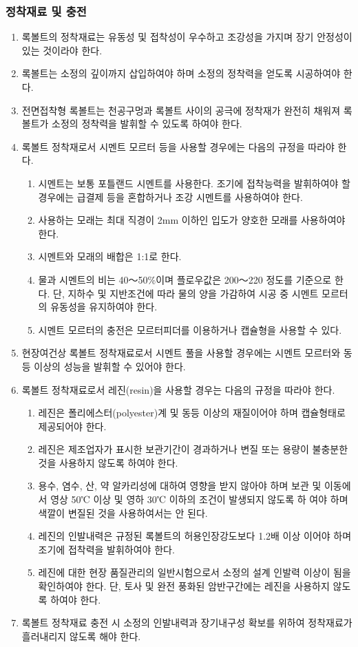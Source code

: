 \subsubsection{정착재료 및 충전}
\begin{enumerate}
\item  록볼트의 정착재료는 유동성 및 접착성이 우수하고 조강성을 가지며 장기 안정성이 있는 것이라야 한다.  
\item  록볼트는 소정의 깊이까지 삽입하여야 하며 소정의 정착력을 얻도록 시공하여야 한다.  
\item  전면접착형 록볼트는 천공구멍과 록볼트 사이의 공극에 정착재가 완전히 채워져 록볼트가 소정의 정착력을 발휘할 수 있도록 하여야 한다.  
\item  록볼트 정착재로서 시멘트 모르터 등을 사용할 경우에는 다음의 규정을 따라야 한다.  
	\begin{enumerate}
	\item  시멘트는 보통 포틀랜드 시멘트를 사용한다. 조기에 접착능력을 발휘하여야 할 경우에는 급결제 등을 혼합하거나 
	       조강 시멘트를 사용하여야 한다. 
	\item  사용하는 모래는 최대 직경이 2mm 이하인 입도가 양호한 모래를 사용하여야 한다. 
	\item  시멘트와 모래의 배합은 1:1로 한다. 
	\item  물과 시멘트의 비는 40～50\%이며 플로우값은 200～220 정도를 기준으로 한다. 
	       단, 지하수 및 지반조건에 따라 물의 양을 가감하여 시공 중 시멘트 모르터의 유동성을 유지하여야 한다. 
	\item  시멘트 모르터의 충전은 모르터피더를 이용하거나 캡슐형을 사용할 수 있다. 
	\end{enumerate}
\item  현장여건상 록볼트 정착재료로서 시멘트 풀을 사용할 경우에는 시멘트 모르터와 동등 이상의 성능을 발휘할 수 있어야 한다.  
\item  록볼트 정착재료로서 레진(resin)을 사용할 경우는 다음의 규정을 따라야 한다.  
	\begin{enumerate}
	\item  레진은 폴리에스터(polyester)계 및 동등 이상의 재질이어야 하며 캡슐형태로 제공되어야 한다. 
	\item  레진은 제조업자가 표시한 보관기간이 경과하거나 변질 또는 용량이 불충분한 것을 사용하지 않도록 하여야 한다. 
	\item  용수, 염수, 산, 약 알카리성에 대하여 영향을 받지 않아야 하며 보관 및 이동에서 영상 50℃ 이상 
	       및 영하 30℃ 이하의 조건이 발생되지 않도록 하	여야 하며 색깔이 변질된 것을 사용하여서는 안 된다. 
	\item  레진의 인발내력은 규정된 록볼트의 허용인장강도보다 1.2배 이상 이어야 하며 조기에 접착력을 발휘하여야 한다. 
	\item  레진에 대한 현장 품질관리의 일반시험으로서 소정의 설계 인발력 이상이 됨을 확인하여야 한다. 
	       단, 토사 및 완전 풍화된 암반구간에는 레진을 사용하지 않도록 하여야 한다. 
	\end{enumerate}
\item  록볼트 정착재료 충전 시 소정의 인발내력과 장기내구성 확보를 위하여 정착재료가 흘러내리지 않도록 해야 한다.   
\end{enumerate}

